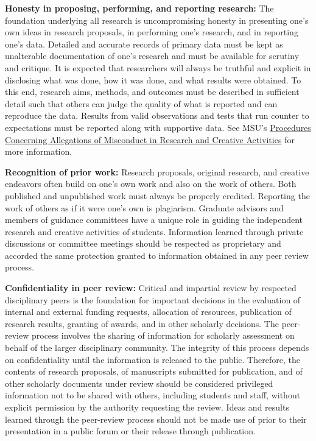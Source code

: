 \textbf{Honesty in proposing, performing, and reporting research:} The
foundation underlying all research is uncompromising honesty in
presenting one’s own ideas in research proposals, in performing one’s
research, and in reporting one’s data. Detailed and accurate records
of primary data must be kept as unalterable documentation of one’s
research and must be available for scrutiny and critique. It is
expected that researchers will always be truthful and explicit in
disclosing what was done, how it was done, and what results were
obtained. To this end, research aims, methods, and outcomes must be
described in sufficient detail such that others can judge the quality
of what is reported and can reproduce the data. Results from valid
observations and tests that run counter to expectations must be
reported along with supportive data.  See MSU's
\href{https://www.hr.msu.edu/documents/facacadhandbooks/facultyhandbook/misconductproc/}{Procedures
  Concerning Allegations of Misconduct in Research and Creative
  Activities} for more information.
 
\textbf{Recognition of prior work:} Research proposals, original
research, and creative endeavors often build on one’s own work and
also on the work of others. Both published and unpublished work must
always be properly credited. Reporting the work of others as if it
were one’s own is plagiarism. Graduate advisors and members of
guidance committees have a unique role in guiding the independent
research and creative activities of students. Information learned
through private discussions or committee meetings should be respected
as proprietary and accorded the same protection granted to information
obtained in any peer review process. 

\textbf{Confidentiality in peer review:} Critical and impartial review
by respected disciplinary peers is the foundation for important
decisions in the evaluation of internal and external funding requests,
allocation of resources, publication of research results, granting of
awards, and in other scholarly decisions. The peer-review process
involves the sharing of information for scholarly assessment on behalf
of the larger disciplinary community. The integrity of this process
depends on confidentiality until the information is released to the
public. Therefore, the contents of research proposals, of manuscripts
submitted for publication, and of other scholarly documents under
review should be considered privileged information not to be shared
with others, including students and staff, without explicit permission
by the authority requesting the review. Ideas and results learned
through the peer-review process should not be made use of prior to
their presentation in a public forum or their release through
publication. 

